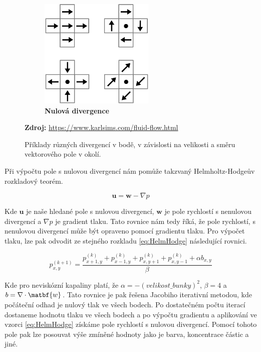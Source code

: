 \begin{figure}[h]
\begin{subfigure}{.3\textwidth}
  	\centering
	\includegraphics[width=0.8\linewidth]{obrazky-figures/div-zero.png}
	\caption{\textbf{Nulová divergence}}
	\label{fig:Lagran}
\end{subfigure}
\caption{Příklady různých divergencí v bodě, v závislosti na velikosti a směru vektorového pole v okolí.}
\textbf{Zdroj:} \url{https://www.karlsims.com/fluid-flow.html}
\label{fig:div}
\end{figure}

Při výpočtu pole s nulovou divergencí nám pomůže takzvaný Helmholtz-Hodgeův rozkladový teorém.

\begin{equation}
\mathbf{u} = \mathbf{w} - \nabla p    
\label{eq:HelmHodge}
\end{equation}

Kde $\mathbf{u}$ je naše hledané pole s nulovou divergencí, $\mathbf{w}$ je pole rychlostí s nenulovou divergencí a $\nabla p$ je gradient tlaku. Tato rovnice nám tedy říká, že pole rychlostí, s nenulovou divergencí může být opraveno pomocí gradientu tlaku. Pro výpočet tlaku, lze pak odvodit ze stejného rozkladu \ref{eq:HelmHodge} následující rovnici.

\begin{equation}
    p_{x,y}^{(k+1)} = \frac{p_{x+1,y}^{(k)} + p_{x-1,y}^{(k)} + p_{x,y+1}^{(k)} + p_{x,y-1}^{(k)} + \alpha b_{x,y}}{\beta}
\end{equation}

Kde pro neviskózní kapaliny platí, že $\alpha = -( velikost\_bunky )^2$, $\beta = 4$ a $b = \nabla \cdot \matbf{w}$. Tato rovnice je pak řešena Jacobiho iterativní metodou, kde počáteční odhad je nulový tlak ve všech bodech. Po dostatečném počtu iterací dostaneme hodnotu tlaku ve všech bodech a po výpočtu gradientu a aplikování ve vzorci \ref{eq:HelmHodge} získáme pole rychlostí s nulovou divergencí. Pomocí tohoto pole pak lze posouvat výše zmíněné hodnoty jako je barva, koncentrace částic a jiné.
\cite{GPUGemsGridFLuid}

